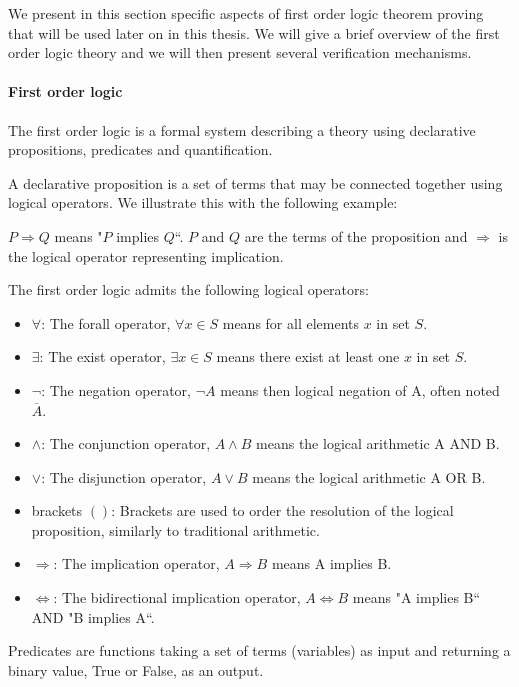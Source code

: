 \label{sec:proving-theory}
We present in this section specific aspects of first order logic theorem proving that will be used later on in this thesis. We will give a brief overview of the first order logic theory and we will then present several verification mechanisms.

\paragraph{First order logic}
The first order logic is a formal system describing a theory using declarative propositions, predicates and quantification.

A declarative proposition is a set of terms  that may be connected together using logical operators.
We illustrate this with the following example:

$P \Rightarrow Q$ means "$P$ implies $Q$``. $P$ and $Q$ are the terms of the proposition and $\Rightarrow$ is the logical operator representing implication.

The first order logic admits the following logical operators:

\begin{itemize}
    \item $\forall$: The forall operator, $\forall x\in S$ means for all elements $x$ in set $S$.
    \item $\exists$: The exist operator, $\exists x\in S$ means there exist at least one $x$ in set $S$.
    \item $\neg$: The negation operator, $\neg A$ means then logical negation of A, often noted $\overline{A}$.
    \item $\wedge$: The conjunction operator, $A \wedge B$ means the logical arithmetic A AND B.
    \item $\vee$: The disjunction operator, $A \vee B$ means the logical arithmetic A OR B.
    \item brackets $( )$: Brackets are used to order the resolution of the logical proposition, similarly to traditional arithmetic.
    \item $\Rightarrow$: The implication operator, $A \Rightarrow B$ means A implies B.
    \item $\Leftrightarrow$: The bidirectional implication operator, $A \Leftrightarrow B$ means "A implies B`` AND "B implies A``.
\end{itemize}

Predicates are functions taking a set of terms (variables) as input and returning a binary value, True or False, as an output.

